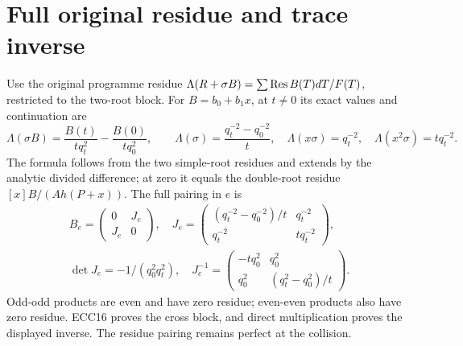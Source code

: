 \documentclass[11pt]{article}
\begin{document}
\section{Full original residue and trace inverse}
Use the original programme residue
$\Lambda(R+\sigma B)=\sum\operatorname{Res} B(T)dT/F(T)$, restricted to the two-root
block. For $B=b_0+b_1x$, at $t\ne0$ its exact values and continuation are
\begin{equation}
 \Lambda(\sigma B)=\frac{B(t)}{tq_t^2}-\frac{B(0)}{tq_0^2},\qquad
 \Lambda(\sigma)=\frac{q_t^{-2}-q_0^{-2}}t,\quad
 \Lambda(x\sigma)=q_t^{-2},\quad
 \Lambda(x^2\sigma)=tq_t^{-2}.
 \tag{ECC16}
\end{equation}
The formula follows from the two simple-root residues and extends by
the analytic divided difference; at zero it equals the double-root
residue $[x]B/(Ah(P+x))$. The full pairing in $e$ is
\begin{equation}
 \begin{gathered}
 B_e=\begin{pmatrix}0&J_e\\J_e&0\end{pmatrix},\quad
 J_e=\begin{pmatrix}(q_t^{-2}-q_0^{-2})/t&q_t^{-2}\\
 q_t^{-2}&tq_t^{-2}\end{pmatrix},\\
 \det J_e=-1/(q_0^2q_t^2),\quad
 J_e^{-1}=\begin{pmatrix}-tq_0^2&q_0^2\\
 q_0^2&(q_t^2-q_0^2)/t\end{pmatrix}.
 \end{gathered}
 \tag{ECC17}
\end{equation}
Odd-odd products are even and have zero residue; even-even products
also have zero residue. ECC16 proves the cross block, and direct
multiplication proves the displayed inverse. The residue pairing remains
perfect at the collision.
\end{document}
